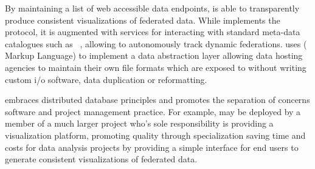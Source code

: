 By maintaining a list of web accessible data endpoints, \sciwms{} is
able to transparently produce consistent visualizations of federated
data. While \sciwms{} implements the \ogc{} \wms{} protocol, it is
augmented with services for interacting with standard meta-data
catalogues such as \csw{}~\cite{csw14}, allowing \sciwms{} to
autonomously track dynamic federations. \sciwms{} uses \ncml{}
(\netcdf{} Markup Language) to implement a data abstraction layer
allowing data hosting agencies to maintain their own file formats
which are exposed to \sciwms{} without writing custom i/o software, data
duplication or reformatting.

\sciwms{} embraces distributed database principles and promotes the
separation of concerns software and project management practice. For
example, \sciwms{} may be deployed by a member of a much larger
project who's sole responsibility is providing a visualization
platform, promoting quality through specialization saving time and
costs for data analysis projects by providing a simple interface for
end users to generate consistent visualizations of federated data.
